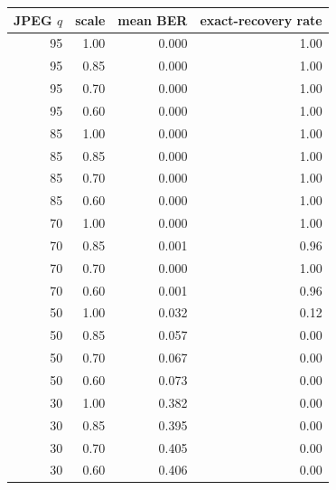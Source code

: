 \begin{tabular}{rrrr}
\toprule
JPEG $q$ & scale & mean BER & exact-recovery rate \\
\midrule
95 & 1.00 & 0.000 & 1.00 \\
95 & 0.85 & 0.000 & 1.00 \\
95 & 0.70 & 0.000 & 1.00 \\
95 & 0.60 & 0.000 & 1.00 \\
85 & 1.00 & 0.000 & 1.00 \\
85 & 0.85 & 0.000 & 1.00 \\
85 & 0.70 & 0.000 & 1.00 \\
85 & 0.60 & 0.000 & 1.00 \\
70 & 1.00 & 0.000 & 1.00 \\
70 & 0.85 & 0.001 & 0.96 \\
70 & 0.70 & 0.000 & 1.00 \\
70 & 0.60 & 0.001 & 0.96 \\
50 & 1.00 & 0.032 & 0.12 \\
50 & 0.85 & 0.057 & 0.00 \\
50 & 0.70 & 0.067 & 0.00 \\
50 & 0.60 & 0.073 & 0.00 \\
30 & 1.00 & 0.382 & 0.00 \\
30 & 0.85 & 0.395 & 0.00 \\
30 & 0.70 & 0.405 & 0.00 \\
30 & 0.60 & 0.406 & 0.00 \\
\bottomrule
\end{tabular}
